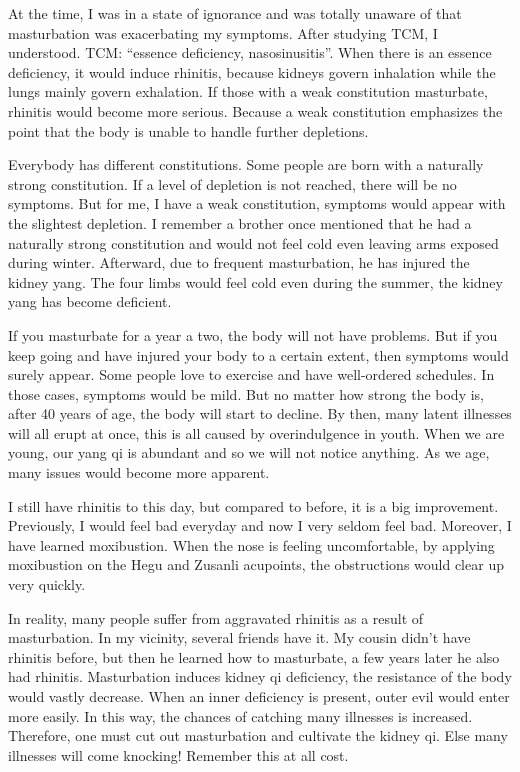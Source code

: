 \documentclass[
]{book}
\begin{document}
At the time, I was in a state of ignorance and was totally unaware of that masturbation was exacerbating my symptoms. After studying TCM, I understood. TCM: ``essence deficiency, nasosinusitis''. When there is an essence deficiency, it would induce rhinitis, because kidneys govern inhalation while the lungs mainly govern exhalation. If those with a weak constitution masturbate, rhinitis would become more serious. Because a weak constitution emphasizes the point that the body is unable to handle further depletions.

Everybody has different constitutions. Some people are born with a naturally strong constitution. If a level of depletion is not reached, there will be no symptoms. But for me, I have a weak constitution, symptoms would appear with the slightest depletion. I remember a brother once mentioned that he had a naturally strong constitution and would not feel cold even leaving arms exposed during winter. Afterward, due to frequent masturbation, he has injured the kidney yang. The four limbs would feel cold even during the summer, the kidney yang has become deficient.

If you masturbate for a year a two, the body will not have problems. But if you keep going and have injured your body to a certain extent, then symptoms would surely appear. Some people love to exercise and have well-ordered schedules. In those cases, symptoms would be mild. But no matter how strong the body is, after 40 years of age, the body will start to decline. By then, many latent illnesses will all erupt at once, this is all caused by overindulgence in youth. When we are young, our yang qi is abundant and so we will not notice anything. As we age, many issues would become more apparent.

I still have rhinitis to this day, but compared to before, it is a big improvement. Previously, I would feel bad everyday and now I very seldom feel bad. Moreover, I have learned moxibustion. When the nose is feeling uncomfortable, by applying moxibustion on the Hegu and Zusanli acupoints, the obstructions would clear up very quickly.

In reality, many people suffer from aggravated rhinitis as a result of masturbation. In my vicinity, several friends have it. My cousin didn't have rhinitis before, but then he learned how to masturbate, a few years later he also had rhinitis. Masturbation induces kidney qi deficiency, the resistance of the body would vastly decrease. When an inner deficiency is present, outer evil would enter more easily. In this way, the chances of catching many illnesses is increased. Therefore, one must cut out masturbation and cultivate the kidney qi. Else many illnesses will come knocking! Remember this at all cost.
\end{document}
